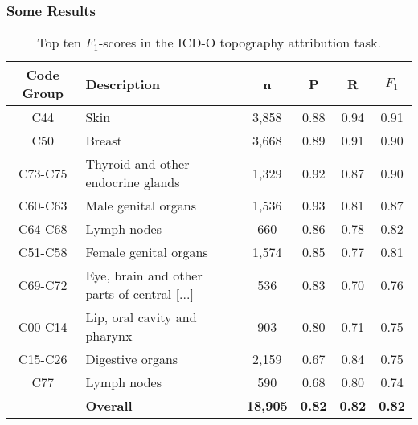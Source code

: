 

\begin{frame}
	\frametitle{Some Results\footnotemark}
\begin{table}[htbp]
    	\footnotesize
	\caption{Top ten $F_1$-scores in the ICD-O topography attribution task.}
	\myfloatalign
    \begin{tabular}{clcccc}
    \toprule
	{\bf Code Group} & {\bf Description} & {\bf n} & {\bf P} & {\bf R} & {\bf $F_1$} \\
	\midrule
	C44 & Skin & 3,858 & 0.88 & 0.94 & 0.91 \\
	C50 & Breast & 3,668 & 0.89 & 0.91 & 0.90 \\
	C73-C75 & Thyroid and other endocrine glands & 1,329 & 0.92 & 0.87 & 0.90 \\
	C60-C63 & Male genital organs & 1,536 & 0.93 & 0.81 & 0.87 \\
	C64-C68 & Lymph nodes & 660 & 0.86 & 0.78 & 0.82 \\
	C51-C58 & Female genital organs & 1,574 & 0.85 & 0.77 & 0.81 \\
	C69-C72 & Eye, brain and other parts of central [...] & 536 & 0.83 & 0.70 & 0.76 \\
	C00-C14 & Lip, oral cavity and pharynx & 903 & 0.80 & 0.71 & 0.75 \\
	C15-C26 & Digestive organs & 2,159 & 0.67 & 0.84 & 0.75 \\
	C77 & Lymph nodes & 590 & 0.68 & 0.80 & 0.74 \\
	\midrule
	& {\bf Overall} & {\bf 18,905} & {\bf 0.82} & {\bf 0.82} & {\bf 0.82} \\
	\bottomrule
    \end{tabular}
  \label{tab:topo_efficiency}
\end{table}

\end{frame}


